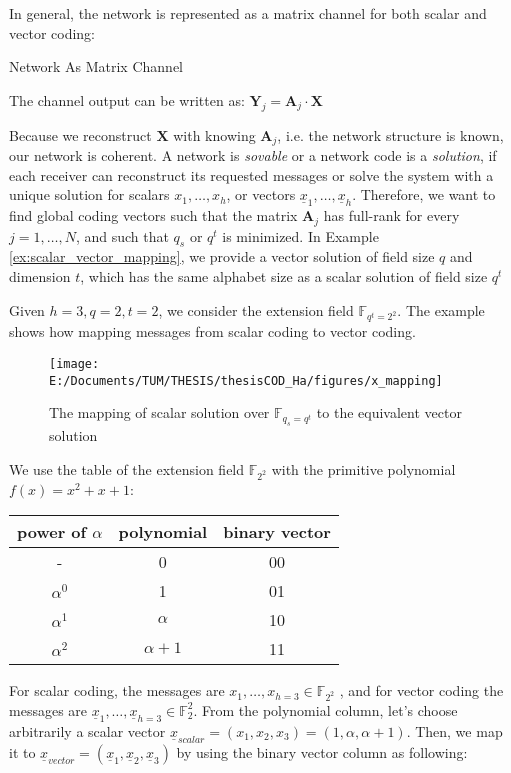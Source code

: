 In general, the network is represented as a matrix channel for both
scalar and vector coding:
\begin{defn}
Network As Matrix Channel

The channel output can be written as: $\boldsymbol{Y}_{j}=\boldsymbol{A}_{j}\cdot\boldsymbol{X}$
\end{defn}
Because we reconstruct $\boldsymbol{X}$ with knowing $\boldsymbol{A}_{j}$,
i.e. the network structure is known, our network is coherent. A network
is \textit{sovable} or a network code is a \textit{solution}, if each
receiver can reconstruct its requested messages or solve the system
with a unique solution for scalars $x_{1},\ldots,x_{h}$, or vectors
$\underline{x}_{1},\ldots,\underline{x}_{h}$. Therefore, we want
to find global coding vectors such that the matrix $\boldsymbol{A}_{j}$
has full-rank for every $j=1,\ldots,N$, and such that $q_{s}$ or
$q^{t}$ is minimized. In Example \ref{ex:scalar_vector_mapping},
we provide a vector solution of field size $q$ and dimension $t$,
which has the same alphabet size as a scalar solution of field size
$q^{t}$
\begin{example}
\label{ex:scalar_vector_mapping} 

Given $h=3,q=2,t=2$, we consider the extension field $\ensuremath{\mathbb{F}}_{q^{t}=2^{2}}$.
The example shows how mapping messages from scalar coding to vector
coding.
\end{example}
\begin{figure}[H]
\caption{The mapping of scalar solution over $\ensuremath{\mathbb{F}}_{q_{s}=q^{t}}$
to the equivalent vector solution\label{fig:x_mapping}}

\texttt{[image: E:/Documents/TUM/THESIS/thesisCOD\_Ha/figures/x\_mapping]}
\end{figure}

\begin{example}
We use the table of the extension field $\ensuremath{\mathbb{F}}_{2^{2}}$
with the primitive polynomial $f(x)=x^{2}+x+1$:
\end{example}
\begin{tabular}{|c|c|c|}
\hline 
power of $\alpha$ & polynomial & binary vector\tabularnewline
\hline 
- & 0 & 00\tabularnewline
\hline 
$\alpha^{0}$ & 1 & 01\tabularnewline
\hline 
$\alpha^{1}$ & $\alpha$ & 10\tabularnewline
\hline 
$\alpha^{2}$ & $\alpha+1$ & 11\tabularnewline
\hline 
\end{tabular}

For scalar coding, the messages are $x_{1},\ldots,x_{h=3}\in\ensuremath{\mathbb{F}}_{2^{2}}$
, and for vector coding the messages are $\underline{x}_{1},\ldots,\underline{x}_{h=3}\in\ensuremath{\mathbb{F}}_{2}^{2}$.
From the polynomial column, let's choose arbitrarily a scalar vector
$\underline{x}_{scalar}=(x_{1},x_{2},x_{3})=(1,\alpha,\alpha+1)$.
Then, we map it to $\underline{x}_{vector}=(\underline{x}_{1},\underline{x}_{2},\underline{x}_{3})$
by using the binary vector column as following:

